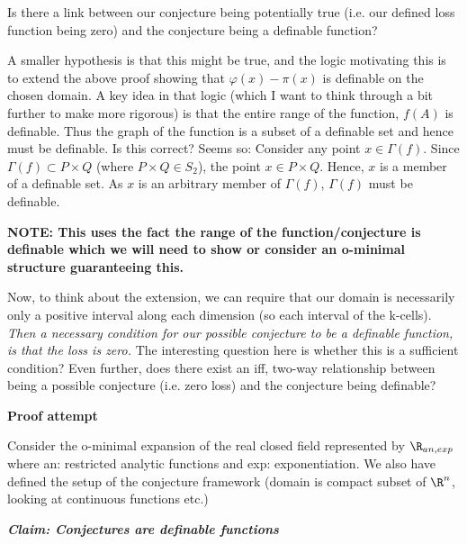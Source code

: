 Is there a link between our conjecture being potentially true (i.e. our defined loss function being zero) and the conjecture being a definable function?
\par A smaller hypothesis is that this might be true, and the logic motivating this is to extend the above proof showing that $\varphi(x) - \pi(x)$ is definable on the chosen domain. A key idea in that logic (which I want to think through a bit further to make more rigorous) is that the entire range of the function, $f(A)$ is definable. Thus the graph of the function is a subset of a definable set and hence must be definable. Is this correct? Seems so: Consider any point $x\in\Gamma(f)$. Since $\Gamma(f)\subset P\times Q$ (where $P\times Q\in S_2$), the point $x\in P\times Q$. Hence, $x$ is a member of a definable set. As $x$ is an arbitrary member of $\Gamma(f)$, $\Gamma(f)$ must be definable.

\textbf{NOTE: This uses the fact the range of the function/conjecture is definable which we will need to show or consider an o-minimal structure guaranteeing this.}

Now, to think about the extension, we can require that our domain is necessarily only a positive interval along each dimension (so each interval of the k-cells). \textit{Then a necessary condition for our possible conjecture to be a definable function, is that the loss is zero.} The interesting question here is whether this is a sufficient condition? Even further, does there exist an iff, two-way relationship between being a possible conjecture (i.e. zero loss) and the conjecture being definable?

\textbf{Proof attempt}

Consider the o-minimal expansion of the real closed field represented by $\R_{an, exp}$ where an: restricted analytic functions and exp: exponentiation. We also have defined the setup of the conjecture framework (domain is compact subset of $\R^n$, looking at continuous functions etc.) \par\textbf{\textit{Claim: Conjectures are definable functions}}


